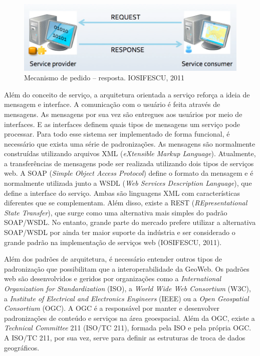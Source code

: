 		\begin{figure}
			\centering
			\includegraphics[width=1\linewidth]{data/pedido-resposta}
			\caption{Mecanismo de pedido – resposta. IOSIFESCU, 2011}
			\label{fig:pedido-resposta}
		\end{figure}
		
		Além do conceito de serviço, a arquitetura orientada a serviço reforça a ideia de mensagem e interface. A comunicação com o usuário é feita através de mensagens. As mensagens por sua vez são entregues aos usuários por meio de interfaces. E as interfaces definem quais tipos de mensagens um serviço pode processar. Para todo esse sistema ser implementado de forma funcional, é necessário que exista uma série de padronizações. As mensagens são normalmente construídas utilizando arquivos XML (\textit{eXtensible Markup Language}). Atualmente, a transferências de mensagens pode ser realizada utilizando dois tipos de serviços web. A SOAP (\textit{Simple Object Access Protocol}) define o formato da mensagem e é normalmente utilizada junto a WSDL (\textit{Web Services Description Language}), que define a interface do serviço.  Ambas são linguagens XML com características diferentes que se complementam. Além disso, existe a REST (\textit{REpresentational State Transfer}), que surge como uma alternativa mais simples do padrão SOAP/WSDL. No entanto, grande parte do mercado prefere utilizar a alternativa SOAP/WSDL por ainda ter maior suporte da indústria e ser considerado o grande padrão na implementação de serviços web (IOSIFESCU, 2011).
		
		Além dos padrões de arquitetura, é necessário entender outros tipos de padronização que possibilitam que a interoperabilidade da GeoWeb. Os padrões web são desenvolvidos e geridos por organizações como a \textit{International Organization for Standardization} (ISO), a \textit{World Wide Web Consortium} (W3C), a \textit{Institute of Electrical and Electronics Engineers} (IEEE) ou a \textit{Open Geospatial Consortium} (OGC). A OGC é a responsável por manter e desenvolver padronizações de conteúdo e serviços na área geoespacial. Além da OGC, existe a \textit{Technical Committee} 211 (ISO/TC 211), formada pela ISO e pela própria OGC. A ISO/TC 211, por sua vez, serve para definir as estruturas de troca de dados geográficos.
		
